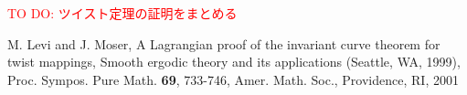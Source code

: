 \documentclass[a4paper]{ujarticle}
\newcommand{\red}[1]{\textcolor{red}{#1}} %
\numberwithin{equation}{section}
\theoremstyle{definition}
\begin{document}
        \red{TO DO: ツイスト定理の証明をまとめる}
    \begin{thebibliography}{10}
    \nocite{*}
	  M. Levi and J. Moser, A Lagrangian proof of the invariant curve theorem for twist mappings, 
    Smooth ergodic theory and its applications (Seattle, WA, 1999), Proc. Sympos. Pure Math. \textbf{69}, 733-746, Amer. Math. Soc., Providence, RI, 2001 
\end{thebibliography}
\end{document}
